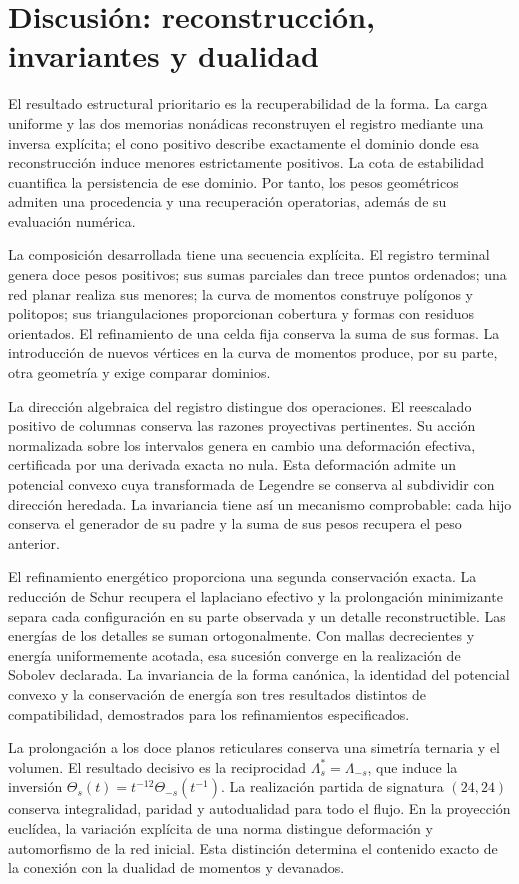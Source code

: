 \documentclass[a4paper,10pt]{article}
\theoremstyle{definition}\newtheorem{definition}[theorem]{Definición}
\theoremstyle{remark}\newtheorem{remark}[theorem]{Observación}
\numberwithin{equation}{section}
\begin{document}
\section{Discusión: reconstrucción, invariantes y dualidad}
\label{sec:discussion}
El resultado estructural prioritario es la recuperabilidad de la forma.
La carga uniforme y las dos memorias nonádicas reconstruyen el registro
mediante una inversa explícita; el cono positivo describe exactamente
el dominio donde esa reconstrucción induce menores estrictamente positivos.
La cota de estabilidad cuantifica la persistencia de ese dominio. Por
tanto, los pesos geométricos admiten una procedencia y una recuperación
operatorias, además de su evaluación numérica.

La composición desarrollada tiene una secuencia explícita. El registro
terminal genera doce pesos positivos; sus sumas parciales dan trece puntos
ordenados; una red planar realiza sus menores; la curva de momentos
construye polígonos y politopos; sus triangulaciones proporcionan cobertura
y formas con residuos orientados. El refinamiento de una celda fija conserva
la suma de sus formas. La introducción de nuevos vértices en la curva de
momentos produce, por su parte, otra geometría y exige comparar dominios.

La dirección algebraica del registro distingue dos operaciones. El
reescalado positivo de columnas conserva las razones proyectivas pertinentes.
Su acción normalizada sobre los intervalos genera en cambio una deformación
efectiva, certificada por una derivada exacta no nula. Esta deformación admite
un potencial convexo cuya transformada de Legendre se conserva al subdividir
con dirección heredada. La invariancia tiene así un mecanismo comprobable:
cada hijo conserva el generador de su padre y la suma de sus pesos recupera
el peso anterior.

El refinamiento energético proporciona una segunda conservación exacta.
La reducción de Schur recupera el laplaciano efectivo y la prolongación
minimizante separa cada configuración en su parte observada y un detalle
reconstructible. Las energías de los detalles se suman ortogonalmente.
Con mallas decrecientes y energía uniformemente acotada, esa sucesión
converge en la realización de Sobolev declarada. La invariancia de la
forma canónica, la identidad del potencial convexo y la conservación de
energía son tres resultados distintos de compatibilidad, demostrados
para los refinamientos especificados.

La prolongación a los doce planos reticulares conserva una simetría
ternaria y el volumen. El resultado decisivo es la reciprocidad
\(\Lambda_s^*=\Lambda_{-s}\), que induce la inversión
\(\Theta_s(t)=t^{-12}\Theta_{-s}(t^{-1})\). La realización partida de
signatura \((24,24)\) conserva integralidad, paridad y autodualidad para
todo el flujo. En la proyección euclídea, la variación explícita de una
norma distingue deformación y automorfismo de la red inicial. Esta
distinción determina el contenido exacto de la conexión con la dualidad
de momentos y devanados.
\end{document}

